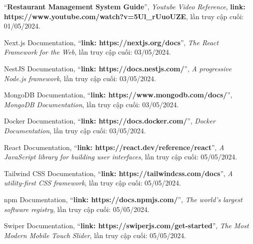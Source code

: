 \documentclass[a4paper]{article}
\begin{document}
\begin{thebibliography}{80}

``\textbf{Restaurant Management System Guide}'',
\textit{Youtube Video Reference}, 
\textbf{link: https://www.youtube.com/watch?v=5Ul\_rUuoUZE},
lần truy cập cuối: 01/05/2024.

Next.js Documentation,
``\textbf{link: https://nextjs.org/docs}'',
\textit{The React Framework for the Web},
lần truy cập cuối: 03/05/2024.

NestJS Documentation,
``\textbf{link: https://docs.nestjs.com/}'',
\textit{A progressive Node.js framework},
lần truy cập cuối: 03/05/2024.

MongoDB Documentation,
``\textbf{link: https://www.mongodb.com/docs/}'',
\textit{MongoDB Documentation},
lần truy cập cuối: 03/05/2024.

Docker Documentation,
``\textbf{link: https://docs.docker.com/}'',
\textit{Docker Documentation},
lần truy cập cuối: 03/05/2024.

React Documentation,
``\textbf{link: https://react.dev/reference/react}'',
\textit{A JavaScript library for building user interfaces},
lần truy cập cuối: 05/05/2024.

Tailwind CSS Documentation,
``\textbf{link: https://tailwindcss.com/docs}'',
\textit{A utility-first CSS framework},
lần truy cập cuối: 05/05/2024.

npm Documentation,
``\textbf{link: https://docs.npmjs.com/}'',
\textit{The world's largest software registry},
lần truy cập cuối: 05/05/2024.

Swiper Documentation,
``\textbf{link: https://swiperjs.com/get-started}'',
\textit{The Most Modern Mobile Touch Slider},
lần truy cập cuối: 05/05/2024.

\end{thebibliography}
\end{document}
